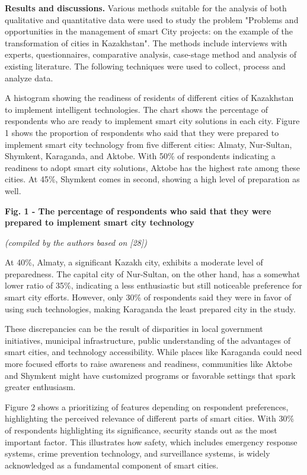 \begin{multicols}{2}
{\bfseries Results and discussions.} Various methods suitable for the
analysis of both qualitative and quantitative data were used to study
the problem "Problems and opportunities in the management of smart City
projects: on the example of the transformation of cities in Kazakhstan".
The methods include interviews with experts, questionnaires, comparative
analysis, case-stage method and analysis of existing literature. The
following techniques were used to collect, process and analyze data.

A histogram showing the readiness of residents of different cities of
Kazakhstan to implement intelligent technologies. The chart shows the
percentage of respondents who are ready to implement smart city
solutions in each city. Figure 1 shows the proportion of respondents who
said that they were prepared to implement smart city technology from
five different cities: Almaty, Nur-Sultan, Shymkent, Karaganda, and
Aktobe. With 50\% of respondents indicating a readiness to adopt smart
city solutions, Aktobe has the highest rate among these cities. At 45\%,
Shymkent comes in second, showing a high level of preparation as well.
\end{multicols}

{\bfseries Fig. 1 - The percentage of respondents who said that they were prepared to implement smart city technology}

\emph{(compiled by the authors based on {[}28{]})}

\begin{multicols}{2}
At 40\%, Almaty, a significant Kazakh city, exhibits a moderate level of
preparedness. The capital city of Nur-Sultan, on the other hand, has a
somewhat lower ratio of 35\%, indicating a less enthusiastic but still
noticeable preference for smart city efforts. However, only 30\% of
respondents said they were in favor of using such technologies, making
Karaganda the least prepared city in the study.

These discrepancies can be the result of disparities in local government
initiatives, municipal infrastructure, public understanding of the
advantages of smart cities, and technology accessibility. While places
like Karaganda could need more focused efforts to raise awareness and
readiness, communities like Aktobe and Shymkent might have customized
programs or favorable settings that spark greater enthusiasm.

Figure 2 shows a prioritizing of features depending on respondent
preferences, highlighting the perceived relevance of different parts of
smart cities. With 30\% of respondents highlighting its significance,
security stands out as the most important factor. This illustrates how
safety, which includes emergency response systems, crime prevention
technology, and surveillance systems, is widely acknowledged as a
fundamental component of smart cities.
\end{multicols}

